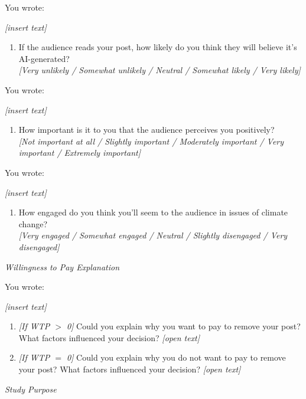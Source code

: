 \documentclass[12pt,notitlepage]{article}
\theoremstyle{plain}
\theoremstyle{plain}
\theoremstyle{definition}
\theoremstyle{definition}
\theoremstyle{assumption}
\theoremstyle{plain}
\theoremstyle{plain}
\theoremstyle{plain}
\theoremstyle{plain}
\theoremstyle{definition}%
\theoremstyle{plain}
\theoremstyle{plain}
\theoremstyle{plain}
\theoremstyle{plain}
\begin{document}
You wrote:

\emph{[insert text]}

\begin{enumerate}
\item If the audience reads your post, how likely do you think they will believe it's AI-generated?\\
\emph{[Very unlikely / Somewhat unlikely / Neutral / Somewhat likely / Very likely]}
\end{enumerate}

You wrote:

\emph{[insert text]}

\begin{enumerate}
\item How important is it to you that the audience perceives you positively?\\
\emph{[Not important at all / Slightly important / Moderately important / Very important / Extremely important]}
\end{enumerate}

You wrote:

\emph{[insert text]}

\begin{enumerate}
\item How engaged do you think you'll seem to the audience in issues of climate change?\\
\emph{[Very engaged / Somewhat engaged / Neutral / Slightly disengaged / Very disengaged]}
\end{enumerate}

\vspace{12pt}
\emph{Willingness to Pay Explanation}

You wrote:

\emph{[insert text]}

\begin{enumerate}
\item \emph{[If WTP $>$ 0]} Could you explain why you want to pay to remove your post? What factors influenced your decision? \emph{[open text]}
\item \emph{[If WTP $=$ 0]} Could you explain why you do not want to pay to remove your post? What factors influenced your decision? \emph{[open text]}
\end{enumerate}

\vspace{12pt}
\emph{Study Purpose}
\end{document}
